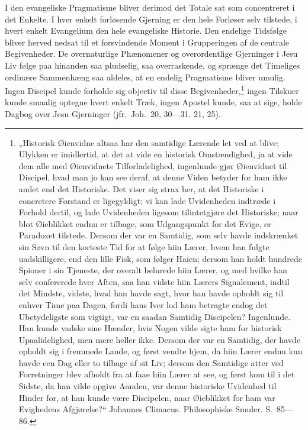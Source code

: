 \documentclass[12pt,a4paper]{book}
\newcommand{\opage}[1]{\marginnote{\footnotesize\textit{[#1]}}}
\begin{document}
I den evangeliske Pragmatisme bliver derimod det Totale sat som
concentreret i det Enkelte. I hver enkelt forløsende Gjerning er den
hele Forløser selv tilstede, i hvert enkelt Evangelium den hele
evangeliske Historie. Den endelige Tidsfølge bliver herved nedsat til et
forsvindende Moment i Grupperingen af de centrale Begivenheder. De
overnaturlige Phænomener og overordentlige Gjerninger i Jesu Liv følge
paa hinanden saa pludselig, saa overraskende, og sprænge det Timeliges
ordinære Sammenhæng saa aldeles, at en endelig Pragmatisme bliver umulig.
Ingen Discipel kunde forholde sig objectiv til disse
Begivenheder,\footnote{„Historisk Øienvidne altsaa har den samtidige
Lærende let ved at blive; Ulykken er imidlertid, at det at vide en
historisk Omstændighed, ja at vide dem alle med Øienvidnets
Tilforladelighed, ingenlunde gjør Øienvidnet til Discipel, hvad man jo
kan see deraf, at denne Viden betyder for ham ikke andet end det
Historiske. Det viser sig strax her, at det Historiske i concretere
Forstand er ligegyldigt; vi kan lade Uvidenheden indtræde i Forhold
dertil, og lade Uvidenheden ligesom tilintetgjøre det Historiske; naar
blot Øieblikket endnu er tilbage, som Udgangspunkt for det Evige, er
Paradoxet tilstede. Dersom der var en Samtidig, som selv havde
indskrænket sin Søvn til den korteste Tid for at følge hiin Lærer, hvem
han fulgte uadskilligere, end den lille Fisk, som følger Haien; dersom
han holdt hundrede Spioner i sin Tjeneste, der overalt belurede hiin
Lærer, og med hvilke han selv confererede hver Aften, saa han vidste hiin
Lærers Signalement, indtil det Mindste, vidste, hvad han havde sagt, hvor
han havde opholdt sig til enhver Time paa Dagen, fordi hans Iver lod ham
betragte endog det Ubetydeligste som vigtigt, var en saadan Samtidig
Discipelen? Ingenlunde. Han kunde vadske sine Hænder, hvis Nogen vilde
sigte ham for historisk Upaalidelighed, men mere heller ikke. Dersom der
var en Samtidig, der havde opholdt sig i fremmede Lande, og først vendte
hjem, da hiin Lærer endnu kun havde een Dag eller to tilbage af sit Liv;
dersom den Samtidige atter ved Forretninger blev afholdt fra at faae hiin
Lærer at see, og først kom til i det Sidste, da han vilde opgive Aanden,
var denne historiske Uvidenhed til Hinder for, at han kunde være
Discipelen, naar Øieblikket for ham var Evighedens Afgjørelse?“ Johannes
Climacus. Philosophiske Smuler. S.\ 85---86.} ingen Tilskuer kunde
smaalig optegne hvert enkelt Træk,
\opage{95} ingen Apostel kunde, saa at sige, holde Dagbog over Jesu Gjerninger (jfr.\
Joh.\ 20, 30---31. 21, 25).
\end{document}
